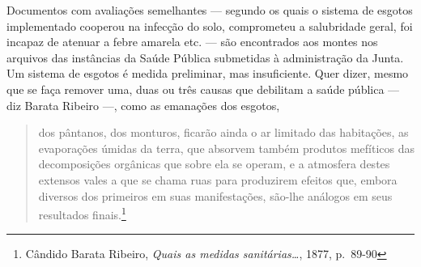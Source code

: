 Documentos com avaliações semelhantes --- segundo os quais o sistema de
esgotos implementado cooperou na infecção do solo, comprometeu a
salubridade geral, foi incapaz de atenuar a febre amarela etc. --- são
encontrados aos montes nos arquivos das instâncias da Saúde Pública
submetidas à administração da Junta. Um sistema de esgotos é medida
preliminar, mas insuficiente. Quer dizer, mesmo que se faça remover uma,
duas ou três causas que debilitam a saúde pública --- diz Barata Ribeiro
---, como as emanações dos esgotos,

\begin{quote}
dos pântanos, dos monturos, ficarão ainda o ar limitado das habitações,
as evaporações úmidas da terra, que absorvem também produtos mefíticos
das decomposições orgânicas que sobre ela se operam, e a atmosfera
destes extensos vales a que se chama ruas para produzirem efeitos que,
embora diversos dos primeiros em suas manifestações, são-lhe análogos em
seus resultados finais.\footnote{Cândido Barata Ribeiro, \textit{Quais as
  medidas sanitárias\ldots{}}, 1877, p.~89-90}
\end{quote}

